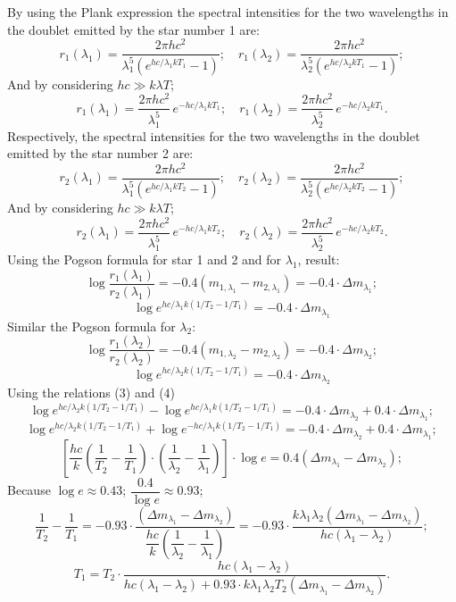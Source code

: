 By using the Plank expression the spectral intensities for the two wavelengths
in the doublet emitted by the star number 1 are:
\[ r_1(\lambda_1) = \frac{2\pi h c^2}
     {\lambda_1^5\left(e^{hc/\lambda_1 k T_1}-1\right)};\quad
   r_1(\lambda_2) = \frac{2\pi h c^2}
     {\lambda_2^5\left(e^{hc/\lambda_2 k T_1}-1\right)}; \]
And by considering $hc \gg k\lambda T$;
\[ r_1(\lambda_1) = \frac{2\pi h c^2}{\lambda_1^5}\,
     e^{-hc/\lambda_1 k T_1};\quad
   r_1(\lambda_2) = \frac{2\pi h c^2}{\lambda_2^5}\,
     e^{-hc/\lambda_2 k T_1}. \tag*{(1)} \]
Respectively, the spectral intensities for the two wavelengths in the doublet
emitted by the star number 2 are:
\[ r_2(\lambda_1) = \frac{2\pi h c^2}
     {\lambda_1^5\left(e^{hc/\lambda_1 k T_2}-1\right)};\quad
   r_2(\lambda_2) = \frac{2\pi h c^2}
     {\lambda_2^5\left(e^{hc/\lambda_2 k T_2}-1\right)}; \]
And by considering $hc \gg k\lambda T$;
\[ r_2(\lambda_1) = \frac{2\pi h c^2}{\lambda_1^5}\,
     e^{-hc/\lambda_1 k T_2};\quad
   r_2(\lambda_2) = \frac{2\pi h c^2}{\lambda_2^5}\,
     e^{-hc/\lambda_2 k T_2}. \tag*{(2)} \]
Using the Pogson formula for star 1 and 2 and for $\lambda_1$, result:
\[ \log\frac{r_1(\lambda_1)}{r_2(\lambda_1)}
   = -0.4\left(m_{1,\lambda_1}-m_{2,\lambda_1}\right)
   = -0.4\cdot\Delta m_{\lambda_1}; \]
\[ \log e^{hc/\lambda_1 k\left(1/T_2-1/T_1\right)}
   = -0.4\cdot\Delta m_{\lambda_1} \tag*{(3)} \]
Similar the Pogson formula for $\lambda_2$:
\[ \log\frac{r_1(\lambda_2)}{r_2(\lambda_2)}
   = -0.4\left(m_{1,\lambda_2}-m_{2,\lambda_2}\right)
   = -0.4\cdot\Delta m_{\lambda_2}; \]
\[ \log e^{hc/\lambda_2 k\left(1/T_2-1/T_1\right)}
   = -0.4\cdot\Delta m_{\lambda_2} \tag*{(4)} \]
Using the relations (3) and (4)
\[ \log e^{hc/\lambda_2 k\left(1/T_2-1/T_1\right)}
   - \log e^{hc/\lambda_1 k\left(1/T_2-1/T_1\right)}
   = -0.4\cdot\Delta m_{\lambda_2} + 0.4\cdot\Delta m_{\lambda_1}; \]
\[ \log e^{hc/\lambda_2 k\left(1/T_2-1/T_1\right)}
   + \log e^{-hc/\lambda_1 k\left(1/T_2-1/T_1\right)}
   = -0.4\cdot\Delta m_{\lambda_2} + 0.4\cdot\Delta m_{\lambda_1}; \]
\[ \left[\frac{hc}{k}\left(\frac{1}{T_2}-\frac{1}{T_1}\right)\cdot
   \left(\frac{1}{\lambda_2}-\frac{1}{\lambda_1}\right)\right]\cdot\log e
   = 0.4\left(\Delta m_{\lambda_1}-\Delta m_{\lambda_2}\right); \]
Because $\log e \approx 0.43$;
$\dfrac{0.4}{\log e}\approx 0.93$;
\[ \frac{1}{T_2}-\frac{1}{T_1}
   = -0.93\cdot\frac{\left(\Delta m_{\lambda_1}-\Delta m_{\lambda_2}\right)}
     {\dfrac{hc}{k}\left(\dfrac{1}{\lambda_2}-\dfrac{1}{\lambda_1}\right)}
   = -0.93\cdot\frac{k\lambda_1\lambda_2
       \left(\Delta m_{\lambda_1}-\Delta m_{\lambda_2}\right)}
     {hc\left(\lambda_1-\lambda_2\right)}; \]
\[ T_1 = T_2\cdot\frac{hc\left(\lambda_1-\lambda_2\right)}
     {hc\left(\lambda_1-\lambda_2\right)
      + 0.93\cdot k\lambda_1\lambda_2 T_2
        \left(\Delta m_{\lambda_1}-\Delta m_{\lambda_2}\right)}. \tag*{(5)} \]

